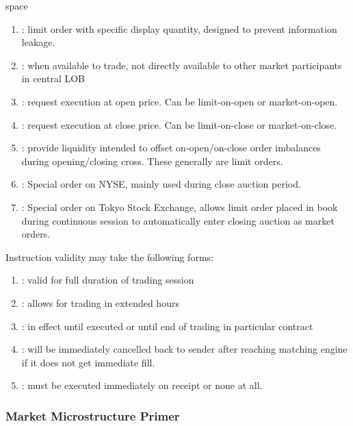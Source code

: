 \begin{definition} {\color{white}space}
\begin{enumerate}[label=\roman*.]
\item {}: limit order with specific display quantity, designed to prevent information leakage.
\item {}: when available to trade, not directly available to other market participants in central LOB
\item {}: request execution at open price. Can be limit-on-open or market-on-open.
\item {}: request execution at close price. Can be limit-on-close or market-on-close.
\item {}: provide liquidity intended to offset on-open/on-close order imbalances during opening/closing cross. These generally are limit orders.
\item {}: Special order on NYSE, mainly used during close auction period.
\item {}: Special order on Tokyo Stock Exchange, allows limit order placed in book during continuous session to automatically enter closing auction as market orders.
\end{enumerate}
\end{definition}

Instruction validity may take the following forms:
\begin{enumerate}[label=\roman*.]
\setlength{\itemsep}{0pt}
\item {}: valid for full duration of trading session
\item {}: allows for trading in extended hours
\item {}: in effect until executed or until end of trading in particular contract
\item {}: will be immediately cancelled back to sender after reaching matching engine if it does not get immediate fill.
\item {}: must be executed immediately on receipt or none at all.
\end{enumerate}


\subsubsection{Market Microstructure Primer}

